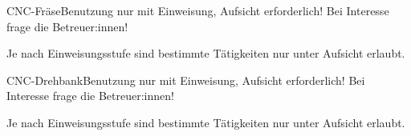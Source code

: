 %
%
%
%
%
%


\newcommand{\werkstattEinweisung}{Benutzung mit allgemeiner Werkstatt-Einweisung}

\begin{schild}[farbe=gelbrot, einweisung=fraese-einweisung,
	kontakt={AG Zerspanung, \mail{zerspanung@fablab.fau.de}}]
	{CNC-Fräse}{Benutzung nur mit Einweisung, Aufsicht erforderlich!}
Bei Interesse frage die Betreuer:innen!

Je nach Einweisungsstufe sind bestimmte Tätigkeiten nur unter Aufsicht erlaubt.
\end{schild}

\begin{schild}[farbe=gelbrot, einweisung=drehbank-einweisung,
	kontakt={AG Zerspanung, \mail{zerspanung@fablab.fau.de}}]
	{CNC-Drehbank}{Benutzung nur mit Einweisung, Aufsicht erforderlich!}
Bei Interesse frage die Betreuer:innen!

Je nach Einweisungsstufe sind bestimmte Tätigkeiten nur unter Aufsicht erlaubt.
\end{schild}

